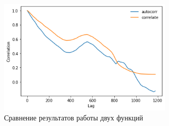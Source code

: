 \documentclass[a4paper, 12pt]{report}
\begin{document}
	\begin{figure}[H]
		\centering
		\includegraphics[width=0.75\textwidth]{bit3.png}
		\caption{Сравнение результатов работы двух функций}
		\label{fig:bit3}
	\end{figure}
\end{document}
